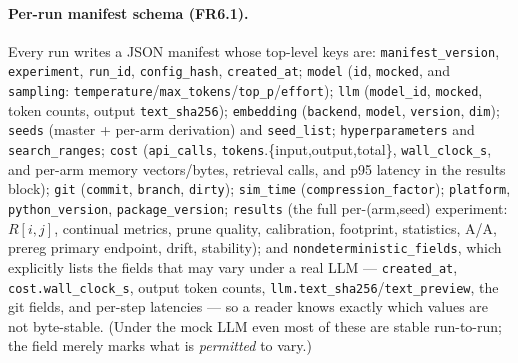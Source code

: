 \paragraph{Per-run manifest schema (FR6.1).} Every run writes a JSON manifest
whose top-level keys are: \texttt{manifest\_version}, \texttt{experiment},
\texttt{run\_id}, \texttt{config\_hash}, \texttt{created\_at};
\texttt{model} (\texttt{id}, \texttt{mocked}, and \texttt{sampling}:
\texttt{temperature}/\texttt{max\_tokens}/\texttt{top\_p}/\texttt{effort});
\texttt{llm} (\texttt{model\_id}, \texttt{mocked}, token counts, output
\texttt{text\_sha256});
\texttt{embedding} (\texttt{backend}, \texttt{model}, \texttt{version},
\texttt{dim});
\texttt{seeds} (master + per-arm derivation) and \texttt{seed\_list};
\texttt{hyperparameters} and \texttt{search\_ranges};
\texttt{cost} (\texttt{api\_calls}, \texttt{tokens}.\{input,output,total\},
\texttt{wall\_clock\_s}, and per-arm memory vectors/bytes, retrieval calls, and
p95 latency in the results block);
\texttt{git} (\texttt{commit}, \texttt{branch}, \texttt{dirty});
\texttt{sim\_time} (\texttt{compression\_factor});
\texttt{platform}, \texttt{python\_version}, \texttt{package\_version};
\texttt{results} (the full per-(arm,seed) experiment: $R[i,j]$, continual
metrics, prune quality, calibration, footprint, statistics, A/A, prereg primary
endpoint, drift, stability); and
\texttt{nondeterministic\_fields}, which explicitly lists the fields that may
vary under a real LLM --- \texttt{created\_at}, \texttt{cost.wall\_clock\_s},
output token counts, \texttt{llm.text\_sha256}/\texttt{text\_preview}, the git
fields, and per-step latencies --- so a reader knows exactly which values are not
byte-stable. (Under the mock LLM even most of these are stable run-to-run; the
field merely marks what is \emph{permitted} to vary.)

